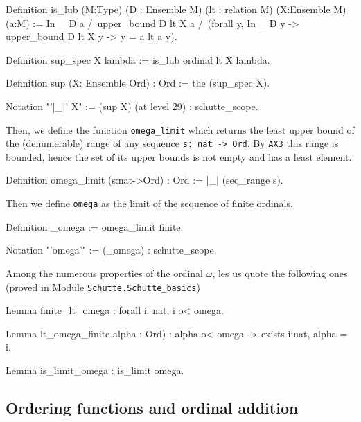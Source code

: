 {\begin{Coqsrc}
Definition is_lub (M:Type)
                  (D : Ensemble M)
                  (lt : relation M)
                  (X:Ensemble M)
                  (a:M) :=
   In _ D a  /\ upper_bound  D lt X a  /\
   (forall y, In _ D y -> upper_bound  D lt X y  -> 
                  y = a \/ lt a y).
\end{Coqsrc}


\begin{Coqsrc}
Definition sup_spec X lambda := is_lub ordinal lt X lambda.

Definition sup (X: Ensemble Ord) : Ord  := the  (sup_spec X).

Notation "'|_|' X" := (sup X) (at level 29) : schutte_scope.
\end{Coqsrc}



Then, we define the function \texttt{omega\_limit} which returns the least upper bound 
of the  (denumerable) range of any sequence \texttt{s: nat -> Ord}. 
By \texttt{AX3} this range is bounded, hence the set of its upper bounds is not empty and has a least element.


\begin{Coqsrc}
Definition omega_limit (s:nat->Ord) : Ord 
  := |_| (seq_range s).
\end{Coqsrc}

Then we define \texttt{omega} as the limit of the sequence of finite ordinals.


\label{sect:notation-omega}
\begin{Coqsrc}
Definition _omega := omega_limit finite.

Notation "'omega'" := (_omega) : schutte_scope.
\end{Coqsrc}



Among the numerous properties of the ordinal $\omega$, les us quote the following ones
(proved in Module 
\href{../src/html/hydras.Schutte.Schutte_basics.html\#finite_lt_omega}{\texttt{Schutte.Schutte\_basics}})

\begin{Coqsrc}
Lemma finite_lt_omega : forall i: nat,  i o< omega.

Lemma lt_omega_finite alpha : Ord) : 
  alpha o< omega ->  exists i:nat, alpha =  i.

Lemma is_limit_omega : is_limit omega.
\end{Coqsrc}


\subsection{Ordering functions and ordinal addition}

}
